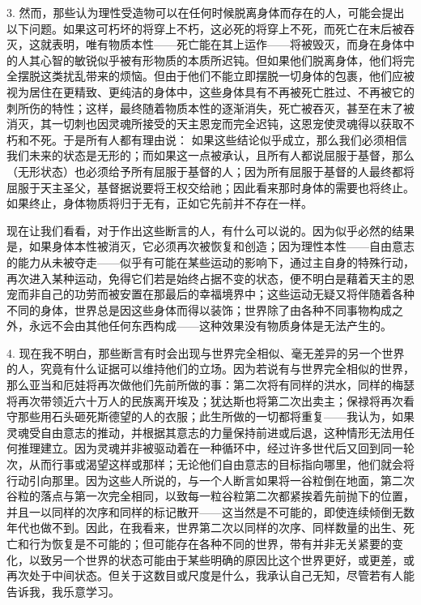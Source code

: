 3. 然而，那些认为理性受造物可以在任何时候脱离身体而存在的人，可能会提出以下问题。如果这可朽坏的将穿上不朽，这必死的将穿上不死，而死亡在末后被吞灭，这就表明，唯有物质本性——死亡能在其上运作——将被毁灭，而身在身体中的人其心智的敏锐似乎被有形物质的本质所迟钝。但如果他们脱离身体，他们将完全摆脱这类扰乱带来的烦恼。但由于他们不能立即摆脱一切身体的包裹，他们应被视为居住在更精致、更纯洁的身体中，这些身体具有不再被死亡胜过、不再被它的刺所伤的特性；这样，最终随着物质本性的逐渐消失，死亡被吞灭，甚至在末了被消灭，其一切刺也因灵魂所接受的天主恩宠而完全迟钝，这恩宠使灵魂得以获取不朽和不死。于是所有人都有理由说： 如果这些结论似乎成立，那么我们必须相信我们未来的状态是无形的；而如果这一点被承认，且所有人都说屈服于基督，那么（无形状态）也必须给予所有屈服于基督的人；因为所有屈服于基督的人最终都将屈服于天主圣父，基督据说要将王权交给祂；因此看来那时身体的需要也将终止。如果终止，身体物质将归于无有，正如它先前并不存在一样。\par

现在让我们看看，对于作出这些断言的人，有什么可以说的。因为似乎必然的结果是，如果身体本性被消灭，它必须再次被恢复和创造；因为理性本性——自由意志的能力从未被夺走——似乎有可能在某些运动的影响下，通过主自身的特殊行动，再次进入某种运动，免得它们若是始终占据不变的状态，便不明白是藉着天主的恩宠而非自己的功劳而被安置在那最后的幸福境界中；这些运动无疑又将伴随着各种不同的身体，世界总是因这些身体而得以装饰；世界除了由各种不同事物构成之外，永远不会由其他任何东西构成——这种效果没有物质身体是无法产生的。\par

4. 现在我不明白，那些断言有时会出现与世界完全相似、毫无差异的另一个世界的人，究竟有什么证据可以维持他们的立场。因为若说有与世界完全相似的世界，那么亚当和厄娃将再次做他们先前所做的事：第二次将有同样的洪水，同样的梅瑟将再次带领近六十万人的民族离开埃及；犹达斯也将第二次出卖主；保禄将再次看守那些用石头砸死斯德望的人的衣服；此生所做的一切都将重复——我认为，如果灵魂受自由意志的推动，并根据其意志的力量保持前进或后退，这种情形无法用任何推理建立。因为灵魂并非被驱动着在一种循环中，经过许多世代后又回到同一轮次，从而行事或渴望这样或那样；无论他们自由意志的目标指向哪里，他们就会将行动引向那里。因为这些人所说的，与一个人断言如果将一谷粒倒在地面，第二次谷粒的落点与第一次完全相同，以致每一粒谷粒第二次都紧挨着先前抛下的位置，并且一以同样的次序和同样的标记散开——这当然是不可能的，即使连续倾倒无数年代也做不到。因此，在我看来，世界第二次以同样的次序、同样数量的出生、死亡和行为恢复是不可能的；但可能存在各种不同的世界，带有并非无关紧要的变化，以致另一个世界的状态可能由于某些明确的原因比这个世界更好，或更差，或再次处于中间状态。但关于这数目或尺度是什么，我承认自己无知，尽管若有人能告诉我，我乐意学习。\par

